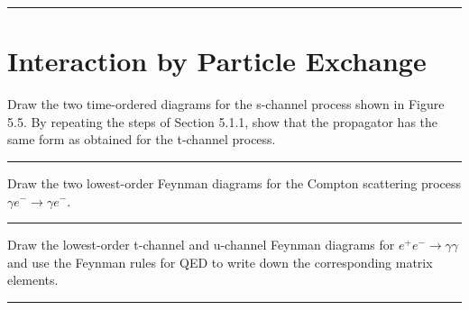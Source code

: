 
\noindent\rule{7in}{2.8pt}
\section{Interaction by Particle Exchange}

\begin{problem}{5.1}
Draw the two time-ordered diagrams for the s-channel process shown in Figure 5.5. By repeating the steps of Section 5.1.1, show that the propagator has the same form as obtained for the t-channel process.\\

\end{problem}
\begin{solution}

\end{solution}

\noindent\rule{7in}{1.5pt}


\begin{problem}{5.2}
Draw the two lowest-order Feynman diagrams for the Compton scattering process $\gamma e^- \to \gamma e^- $.
\end{problem}
\begin{solution}

\end{solution}

\noindent\rule{7in}{1.5pt}


\begin{problem}{5.3}
 Draw the lowest-order t-channel and u-channel Feynman diagrams for $e^+e^-\to\gamma\gamma$ and use the Feynman rules for QED to write down the corresponding matrix elements.
\end{problem}
\begin{solution}

\end{solution}

\noindent\rule{7in}{1.5pt}


